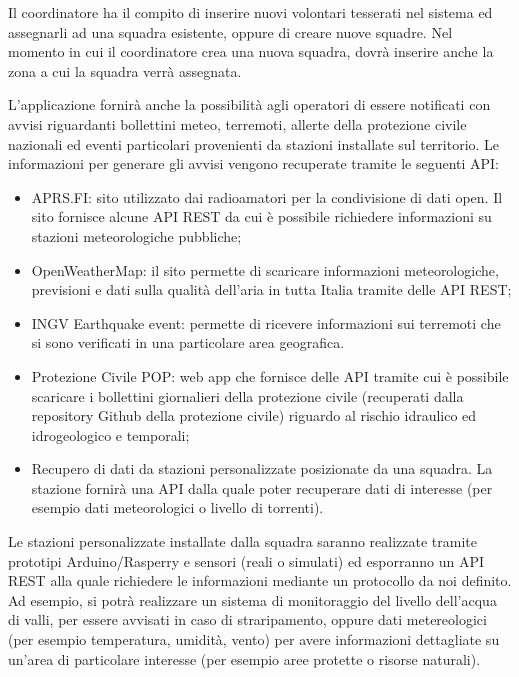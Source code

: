 Il coordinatore ha il compito di inserire nuovi volontari tesserati nel sistema ed assegnarli ad una squadra esistente, oppure di creare nuove squadre. Nel momento in cui il coordinatore crea una nuova squadra, dovrà inserire anche la zona a cui la squadra verrà assegnata.

L’applicazione fornirà anche la possibilità agli operatori di essere notificati con avvisi riguardanti bollettini meteo, terremoti, allerte della protezione civile nazionali ed eventi particolari provenienti da stazioni installate sul territorio. Le informazioni per generare gli avvisi vengono recuperate tramite le seguenti API: 
\begin{itemize}
	\item APRS.FI: sito utilizzato dai radioamatori per la condivisione di dati open. Il sito fornisce alcune API REST da cui è possibile richiedere informazioni su stazioni meteorologiche pubbliche;
	\item OpenWeatherMap: il sito permette di scaricare informazioni meteorologiche, previsioni e dati sulla qualità dell’aria in tutta Italia tramite delle API REST;
	\item INGV Earthquake event: permette di ricevere informazioni sui terremoti che si sono verificati in una particolare area geografica.
	\item Protezione Civile POP: web app che fornisce delle API tramite cui è possibile scaricare i bollettini giornalieri della protezione civile (recuperati dalla repository Github della protezione civile) riguardo al rischio idraulico ed idrogeologico e temporali;
	\item Recupero di dati da stazioni personalizzate posizionate da una squadra. La stazione fornirà una API dalla quale poter recuperare dati di interesse (per esempio dati meteorologici o livello di torrenti). 
\end{itemize}

Le stazioni personalizzate installate dalla squadra saranno realizzate tramite prototipi Arduino/Rasperry e sensori (reali o simulati) ed esporranno un API REST alla quale richiedere le informazioni mediante un protocollo da noi definito. Ad esempio, si potrà realizzare un sistema di monitoraggio del livello dell’acqua di valli, per essere avvisati in caso di straripamento, oppure dati metereologici (per esempio temperatura, umidità, vento) per avere informazioni dettagliate su un’area di particolare interesse (per esempio aree protette o risorse naturali). 

